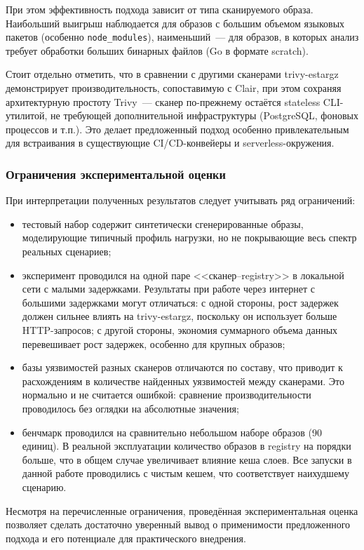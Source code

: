 При этом эффективность подхода зависит от типа сканируемого образа. Наибольший выигрыш наблюдается для образов с большим объемом языковых пакетов (особенно \texttt{node\_modules}), наименьший~--- для образов, в которых анализ требует обработки больших бинарных файлов (Go в формате scratch).

Стоит отдельно отметить, что в сравнении с другими сканерами trivy-estargz демонстрирует производительность, сопоставимую с Clair, при этом сохраняя архитектурную простоту Trivy~--- сканер по-прежнему остаётся stateless CLI-утилитой, не требующей дополнительной инфраструктуры (PostgreSQL, фоновых процессов и т.п.). Это делает предложенный подход особенно привлекательным для встраивания в существующие CI/CD-конвейеры и serverless-окружения.

\subsubsection{Ограничения экспериментальной оценки}

При интерпретации полученных результатов следует учитывать ряд ограничений:

\begin{itemize}
\item тестовый набор содержит синтетически сгенерированные образы, моделирующие типичный профиль нагрузки, но не покрывающие весь спектр реальных сценариев;
\item эксперимент проводился на одной паре <<сканер--registry>> в локальной сети с малыми задержками. Результаты при работе через интернет с большими задержками могут отличаться: с одной стороны, рост задержек должен сильнее влиять на trivy-estargz, поскольку он использует больше HTTP-запросов; с другой стороны, экономия суммарного объема данных перевешивает рост задержек, особенно для крупных образов;
\item базы уязвимостей разных сканеров отличаются по составу, что приводит к расхождениям в количестве найденных уязвимостей между сканерами. Это нормально и не считается ошибкой: сравнение производительности проводилось без оглядки на абсолютные значения;
\item бенчмарк проводился на сравнительно небольшом наборе образов (90 единиц). В реальной эксплуатации количество образов в registry на порядки больше, что в общем случае увеличивает влияние кеша слоев. Все запуски в данной работе проводились с чистым кешем, что соответствует наихудшему сценарию.
\end{itemize}

Несмотря на перечисленные ограничения, проведённая экспериментальная оценка позволяет сделать достаточно уверенный вывод о применимости предложенного подхода и его потенциале для практического внедрения.

\newpage
